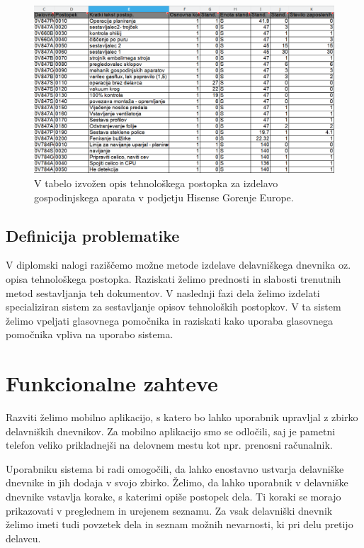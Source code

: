 \documentclass[a4paper, 12pt]{book}
\begin{document}
\begin{figure}[H]
\begin{center}
\includegraphics[width=13.5cm]{sap_2}
\end{center}
\caption{V tabelo izvožen opis tehnološkega postopka za izdelavo gospodinjskega aparata v podjetju Hisense Gorenje Europe.}
\label{sap_2}
\end{figure}

\subsection{Definicija problematike}

V diplomski nalogi raziščemo možne metode izdelave delavniškega dnevnika oz. opisa tehnološkega postopka.
Raziskati želimo prednosti in slabosti trenutnih metod sestavljanja teh dokumentov.
V naslednji fazi dela želimo izdelati specializiran sistem za sestavljanje opisov tehnoloških postopkov.
V ta sistem želimo vpeljati glasovnega pomočnika in raziskati kako uporaba glasovnega pomočnika vpliva na uporabo sistema.

\section{Funkcionalne zahteve}

Razviti želimo mobilno aplikacijo, s katero bo lahko uporabnik upravljal z zbirko delavniških dnevnikov.
Za mobilno aplikacijo smo se odločili, saj je pametni telefon veliko prikladnejši na delovnem mestu kot npr. prenosni računalnik.

Uporabniku sistema bi radi omogočili, da lahko enostavno ustvarja delavniške dnevnike in jih dodaja v svojo zbirko.
Želimo, da lahko uporabnik v delavniške dnevnike vstavlja korake, s katerimi opiše postopek dela.
Ti koraki se morajo prikazovati v preglednem in urejenem seznamu.
Za vsak delavniški dnevnik želimo imeti tudi povzetek dela in seznam možnih nevarnosti, ki pri delu pretijo delavcu.
\end{document}
